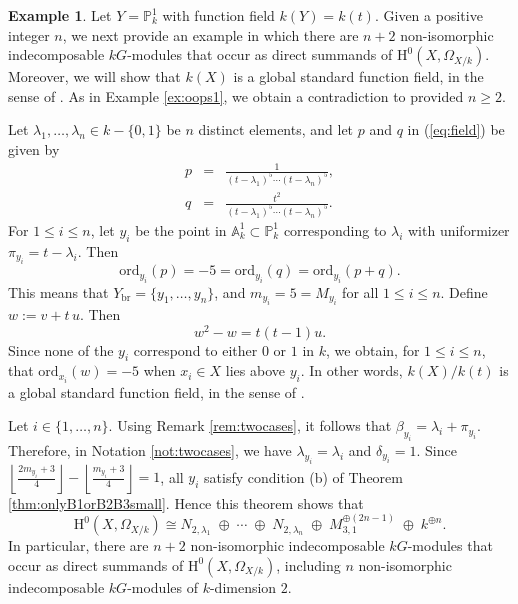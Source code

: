 \documentclass{amsart}
\numberwithin{equation}{section}
\numberwithin{table}{section}
\theoremstyle{plain}
\theoremstyle{definition}
\newtheorem{example}[theorem]{Example}
\theoremstyle{remark}
\newcommand{\HH}{\mathrm{H}}
\begin{document}
\begin{example}
\label{ex:oops2}
Let $Y=\mathbb{P}^1_k$ with function field $k(Y)=k(t)$. Given a positive integer $n$, we next provide an example in which there are $n+2$ non-isomorphic indecomposable $kG$-modules that occur as direct summands of $\HH^0(X,\Omega_{X/k})$. Moreover, we will show that $k(X)$ is a global standard function field, in the sense of \cite[Definitions 2.1 and 3.1]{MarquesWard2018}. As in Example \ref{ex:oops1}, we obtain a contradiction to \cite[Theorem 6.4]{MarquesWard2018} provided $n\ge 2$.

Let 
$\lambda_1,\ldots,\lambda_n \in k-\{0,1\}$ be $n$ distinct elements,
and let $p$ and $q$ in (\ref{eq:field}) be given by
\begin{eqnarray*}
p&=&\frac{1}{(t-\lambda_1)^5\cdots (t-\lambda_n)^5},\\
q&=&\frac{t^2}{(t-\lambda_1)^5\cdots (t-\lambda_n)^5} .
\end{eqnarray*}
For $1\le i\le n$, let $y_i$ be the point in $\mathbb{A}^1_k\subset \mathbb{P}^1_k$ corresponding to $\lambda_i$ with uniformizer $\pi_{y_i}=t-\lambda_i$. Then
$$\mathrm{ord}_{y_i}(p) = -5 = \mathrm{ord}_{y_i}(q) = \mathrm{ord}_{y_i}(p+q).$$
This means that $Y_{\mathrm{br}}=\{y_1,\ldots,y_n\}$, and $m_{y_i}=5=M_{y_i}$ for all $1\le i\le n$. Define
$w:=v+  t \,u$. Then 
$$w^2 - w = 
t ( t -1) u.$$
Since none of the $y_i$ correspond to either $0$ or $1$ in $k$, we obtain, for $1\le i \le n$, that $\mathrm{ord}_{x_i}(w) = -5$ when $x_i\in X$ lies above $y_i$. In other words, $k(X)/k(t)$ is a global standard function field, in the sense of \cite[Definitions 2.1 and 3.1]{MarquesWard2018}. 

Let $i\in\{1,\ldots,n\}$.
Using Remark \ref{rem:twocases}, it follows that $\beta_{y_i} = \lambda_i + \pi_{y_i}$. Therefore, in Notation \ref{not:twocases}, we have $\lambda_{y_i}=\lambda_i$ and $\delta_{y_i}=1$. 
Since $\left\lfloor \frac{2m_{y_i}+3}{4}\right\rfloor - \left\lfloor \frac{m_{y_i}+3}{4}\right\rfloor = 1$, all $y_i$ satisfy condition (b) of Theorem \ref{thm:onlyB1orB2B3small}. Hence this theorem shows that
$$\HH^0(X,\Omega_{X/k})\cong  N_{2,\lambda_1}\;\oplus\; \cdots \;\oplus\; N_{2,\lambda_n} 
\;\oplus\; M_{3,1}^{\oplus (2n-1)} \;\oplus\; k^{\oplus n}.$$
In particular, there are $n+2$ non-isomorphic indecomposable $kG$-modules that occur as direct summands of $\HH^0(X,\Omega_{X/k})$, including $n$ non-isomorphic indecomposable $kG$-modules of $k$-dimension $2$.
\end{example}
\end{document}
